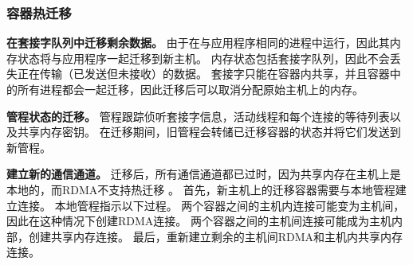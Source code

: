 

\subsubsection{容器热迁移}
\label{socksdirect:subsubsec:container_live_migration}


\textbf {在套接字队列中迁移剩余数据。}
由于\libipc {}在与应用程序相同的进程中运行，因此其内存状态将与应用程序一起迁移到新主机。
内存状态包括套接字队列，因此不会丢失正在传输（已发送但未接收）的数据。
套接字只能在容器内共享，并且容器中的所有进程都会一起迁移，因此迁移后可以取消分配原始主机上的内存。

\textbf {管程状态的迁移。}
管程跟踪侦听套接字信息，活动线程和每个连接的等待列表以及共享内存密钥。
在迁移期间，旧管程会转储已迁移容器的状态并将它们发送到新管程。

\textbf {建立新的通信通道。}
迁移后，所有通信通道都已过时，因为共享内存在主机上是本地的，而RDMA不支持热迁移 \cite{nsdi19freeflow,slim}。
首先，新主机上的迁移容器需要与本地管程建立连接。
本地管程指示以下过程。
两个容器之间的主机内连接可能变为主机间，因此\libipc {}在这种情况下创建RDMA连接。
两个容器之间的主机间连接可能成为主机内部，\libipc {}创建共享内存连接。
最后，\libipc {}重新建立剩余的主机间RDMA和主机内共享内存连接。


%

